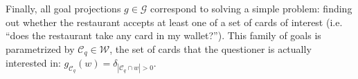 \documentclass[12pt, floatsintext, jou]{apa6}
\begin{document}
Finally, all goal projections $g \in \mathcal{G}$ correspond to solving a simple problem: finding out whether the restaurant accepts at least one of a set of cards of interest (i.e. ``does the restaurant take any card in my wallet?''). This family of goals is parametrized by $\mathcal{C}_q \in \mathcal{W}$, the set of cards that the questioner is actually interested in: 
$g_{\mathcal{C}_q}(w) = \delta_{|\mathcal{C}_q \cap w | > 0}$.


\end{document}

